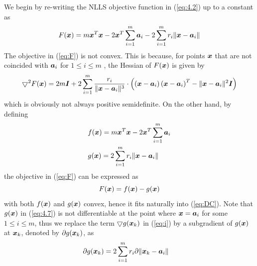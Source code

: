 We begin by re-writing the NLLS objective function in (\ref{eq:4.2}) up to a constant as
\setcounter{abc}{0} 
\begin{equation} \label{eq:F}
 F(\mbox{\boldmath$x$}) =  m\mbox{\boldmath$x$}^T\mbox{\boldmath$x$} - 2 \mbox{\boldmath$x$}^T\sum^m_{i=1} \mbox{\boldmath$a$}_i
  - 2\sum^m_{i = 1} r_i \|\mbox{\boldmath$x$} - \mbox{\boldmath$a$}_i\| 
\end{equation}
The objective in (\ref{eq:F}) is not convex. This is because, for points $\mbox{\boldmath$x$}$ that are not coincided with $\mbox{\boldmath$a$}_i$ for $1 \leq i \leq m$ , the Hessian of $F(\mbox{\boldmath$x$})$ is given by
\begin{equation}
\nonumber
\bigtriangledown ^2 F(\Bx)  = 2m\BI  + %
2\sum^m_{i=1} \frac{r_i}{\|\Bx - \Ba_i\|^3} \cdot %
\left( \left(\Bx - \Ba_i\right)\left(\Bx - \Ba_i\right)^T - \|\Bx - \Ba_i\|^2 \BI \right)
\end{equation}
which is obviously not always positive semidefinite.  On the other hand, by defining 
\begin{equation}  \label{eq:4.7}
\begin{aligned}
& f(\Bx) =  %
m \Bx^T\Bx - 2 \Bx^T\sum^m_{i=1} \Ba_i \\%
& g(\Bx) = 2 \sum^m_{i = 1} r_i \|\Bx - \Ba_i\|
\end{aligned}
\end{equation}
the objective in (\ref{eq:F}) can be expressed as%
\begin{equation}
\nonumber
F(\mbox{\boldmath$x$}) = f(\mbox{\boldmath$x$}) - g(\mbox{\boldmath$x$})
\end{equation} with both $f(\mbox{\boldmath$x$})$ and $g(\mbox{\boldmath$x$})$ convex, hence it fits naturally into (\ref{eq:DC}). Note that $g(\mbox{\boldmath$x$})$ in (\ref{eq:4.7}) is not differentiable at the point where $\mbox{\boldmath$x$} = \mbox{\boldmath$a$}_i$ for some $1 \leq i \leq m$, thus we replace the term $\bigtriangledown g(\mbox{\boldmath$x$}_k)$ in (\ref{eq:i}) by a subgradient \cite{Nes} of $g(\mbox{\boldmath$x$})$ at $\mbox{\boldmath$x$}_k$, denoted by $\partial g(\mbox{\boldmath$x$}_k)$, as
\begin{equation} %
\nonumber
\begin{aligned}
\partial g{(\Bx_k)} & = 2 \sum^m_{i = 1} r_i \partial \|\Bx_k - \Ba_i\| 
\end{aligned}
\end{equation}
